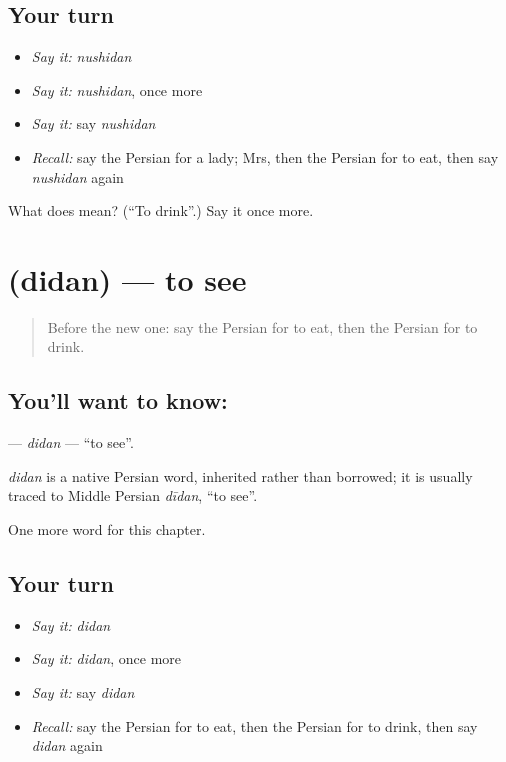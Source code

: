 \subsection*{Your turn}
\begin{itemize}
\raggedright
  \item \emph{Say it:} \emph{nushidan}
  \item \emph{Say it:} \emph{nushidan}, once more
  \item \emph{Say it:} say \emph{nushidan}
  \item \emph{Recall:} say the Persian for a lady; Mrs, then the Persian for to eat, then say \emph{nushidan} again
\end{itemize}

\begin{tcolorbox}[breakable,colback=teal!4,colframe=teal!35!black,title={Before you move on}]
What does  mean? (\textquotedblleft{}To drink\textquotedblright{}.) Say it once more.
\end{tcolorbox}
\section[\texorpdfstring{\fa{دیدن} (didan)}{دیدن (didan)}]{ (didan) — to see}

\label{lesson:FA-C35-didan}



\begin{quote}
Before the new one: say the Persian for to eat, then the Persian for to drink.
\end{quote}

\subsection*{You'll want to know: }
\textbf{} — \emph{didan} — \textquotedblleft{}to see\textquotedblright{}.

\begin{cousinweb}
\emph{didan} is a native Persian word, inherited rather than borrowed; it is usually traced to Middle Persian \emph{dīdan}, \textquotedblleft{}to see\textquotedblright{}.
\end{cousinweb}

\begin{grammarlens}[title={What you've built}]
One more word for this chapter.
\end{grammarlens}

\subsection*{Your turn}
\begin{itemize}
\raggedright
  \item \emph{Say it:} \emph{didan}
  \item \emph{Say it:} \emph{didan}, once more
  \item \emph{Say it:} say \emph{didan}
  \item \emph{Recall:} say the Persian for to eat, then the Persian for to drink, then say \emph{didan} again
\end{itemize}

